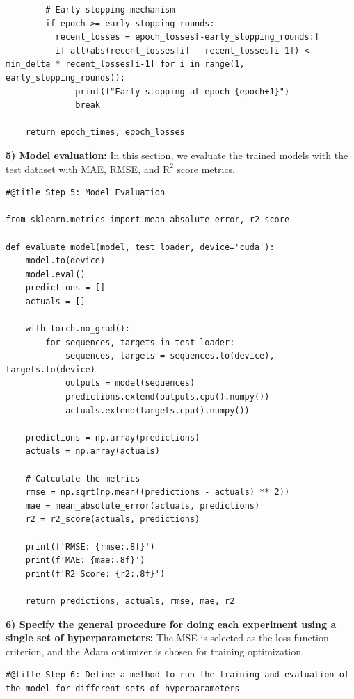\documentclass[journal,onecolumn]{IEEEtran}
\begin{document}
{\begin{appendices}
\begin{verbatim}
        # Early stopping mechanism
        if epoch >= early_stopping_rounds:
          recent_losses = epoch_losses[-early_stopping_rounds:]
          if all(abs(recent_losses[i] - recent_losses[i-1]) < min_delta * recent_losses[i-1] for i in range(1, early_stopping_rounds)):
              print(f"Early stopping at epoch {epoch+1}")
              break

    return epoch_times, epoch_losses
\end{verbatim}

\textbf{5) Model evaluation: } In this section, we evaluate the trained models with the test dataset with MAE, RMSE, and $\text{R}^2$ score metrics.
\begin{verbatim}
#@title Step 5: Model Evaluation

from sklearn.metrics import mean_absolute_error, r2_score

def evaluate_model(model, test_loader, device='cuda'):
    model.to(device)
    model.eval()
    predictions = []
    actuals = []

    with torch.no_grad():
        for sequences, targets in test_loader:
            sequences, targets = sequences.to(device), targets.to(device)
            outputs = model(sequences)
            predictions.extend(outputs.cpu().numpy())
            actuals.extend(targets.cpu().numpy())

    predictions = np.array(predictions)
    actuals = np.array(actuals)

    # Calculate the metrics
    rmse = np.sqrt(np.mean((predictions - actuals) ** 2))
    mae = mean_absolute_error(actuals, predictions)
    r2 = r2_score(actuals, predictions)

    print(f'RMSE: {rmse:.8f}')
    print(f'MAE: {mae:.8f}')
    print(f'R2 Score: {r2:.8f}')

    return predictions, actuals, rmse, mae, r2
\end{verbatim}

\textbf{6) Specify the general procedure for doing each experiment using a single set of hyperparameters: } The MSE is selected as the loss function criterion, and the Adam optimizer is chosen for training optimization.
\begin{verbatim}
#@title Step 6: Define a method to run the training and evaluation of the model for different sets of hyperparameters


\end{verbatim}
\end{appendices}}
\end{document}

